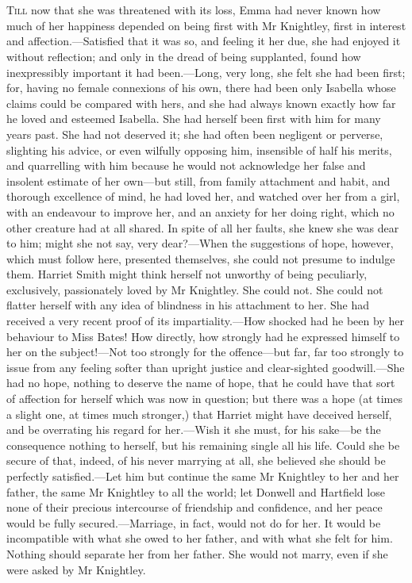 \chapter[Chapter \thechapter]{}
\lettrine[lines=4,lraise=0.3]{T}{ill} now that she was threatened with its loss, Emma had never known how much of her happiness depended on being first with Mr Knightley, first in interest and affection.—Satisfied that it was so, and feeling it her due, she had enjoyed it without reflection; and only in the dread of being supplanted, found how inexpressibly important it had been.—Long, very long, she felt she had been first; for, having no female connexions of his own, there had been only Isabella whose claims could be compared with hers, and she had always known exactly how far he loved and esteemed Isabella. She had herself been first with him for many years past. She had not deserved it; she had often been negligent or perverse, slighting his advice, or even wilfully opposing him, insensible of half his merits, and quarrelling with him because he would not acknowledge her false and insolent estimate of her own—but still, from family attachment and habit, and thorough excellence of mind, he had loved her, and watched over her from a girl, with an endeavour to improve her, and an anxiety for her doing right, which no other creature had at all shared. In spite of all her faults, she knew she was dear to him; might she not say, very dear?—When the suggestions of hope, however, which must follow here, presented themselves, she could not presume to indulge them. Harriet Smith might think herself not unworthy of being peculiarly, exclusively, passionately loved by Mr Knightley. She could not. She could not flatter herself with any idea of blindness in his attachment to her. She had received a very recent proof of its impartiality.—How shocked had he been by her behaviour to Miss Bates! How directly, how strongly had he expressed himself to her on the subject!—Not too strongly for the offence—but far, far too strongly to issue from any feeling softer than upright justice and clear-sighted goodwill.—She had no hope, nothing to deserve the name of hope, that he could have that sort of affection for herself which was now in question; but there was a hope (at times a slight one, at times much stronger,) that Harriet might have deceived herself, and be overrating his regard for her.—Wish it she must, for his sake—be the consequence nothing to herself, but his remaining single all his life. Could she be secure of that, indeed, of his never marrying at all, she believed she should be perfectly satisfied.—Let him but continue the same Mr Knightley to her and her father, the same Mr Knightley to all the world; let Donwell and Hartfield lose none of their precious intercourse of friendship and confidence, and her peace would be fully secured.—Marriage, in fact, would not do for her. It would be incompatible with what she owed to her father, and with what she felt for him. Nothing should separate her from her father. She would not marry, even if she were asked by Mr Knightley.


